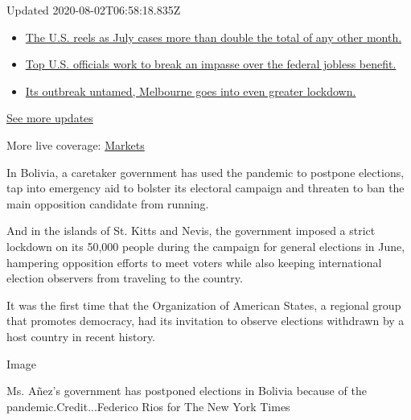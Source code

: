 Updated 2020-08-02T06:58:18.835Z

\begin{itemize}
\tightlist
\item
  \href{https://www.nytimes.com/2020/08/01/world/coronavirus-covid-19.html?action=click\&pgtype=Article\&state=default\&region=MAIN_CONTENT_1\&context=storylines_live_updates\#link-34047410}{The
  U.S. reels as July cases more than double the total of any other
  month.}
\item
  \href{https://www.nytimes.com/2020/08/01/world/coronavirus-covid-19.html?action=click\&pgtype=Article\&state=default\&region=MAIN_CONTENT_1\&context=storylines_live_updates\#link-780ec966}{Top
  U.S. officials work to break an impasse over the federal jobless
  benefit.}
\item
  \href{https://www.nytimes.com/2020/08/01/world/coronavirus-covid-19.html?action=click\&pgtype=Article\&state=default\&region=MAIN_CONTENT_1\&context=storylines_live_updates\#link-2bc8948}{Its
  outbreak untamed, Melbourne goes into even greater lockdown.}
\end{itemize}

\href{https://www.nytimes.com/2020/08/01/world/coronavirus-covid-19.html?action=click\&pgtype=Article\&state=default\&region=MAIN_CONTENT_1\&context=storylines_live_updates}{See
more updates}

More live coverage:
\href{https://www.nytimes.com/live/2020/07/31/business/stock-market-today-coronavirus?action=click\&pgtype=Article\&state=default\&region=MAIN_CONTENT_1\&context=storylines_live_updates}{Markets}

In Bolivia, a caretaker government has used the pandemic to postpone
elections, tap into emergency aid to bolster its electoral campaign and
threaten to ban the main opposition candidate from running.

And in the islands of St. Kitts and Nevis, the government imposed a
strict lockdown on its 50,000 people during the campaign for general
elections in June, hampering opposition efforts to meet voters while
also keeping international election observers from traveling to the
country.

It was the first time that the Organization of American States, a
regional group that promotes democracy, had its invitation to observe
elections withdrawn by a host country in recent history.

Image

Ms. Añez's government has postponed elections in Bolivia because of the
pandemic.Credit...Federico Rios for The New York Times

